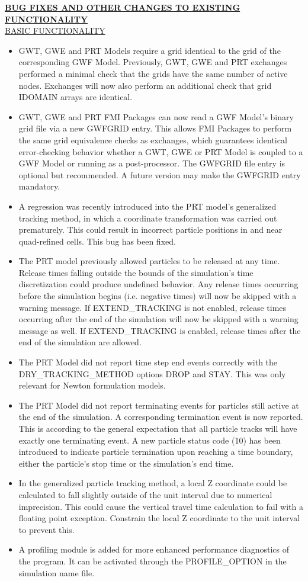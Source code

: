 \textbf{\underline{BUG FIXES AND OTHER CHANGES TO EXISTING FUNCTIONALITY}} \\
\underline{BASIC FUNCTIONALITY}
\begin{itemize}
	\item GWT, GWE and PRT Models require a grid identical to the grid of the corresponding GWF Model. Previously, GWT, GWE and PRT exchanges performed a minimal check that the grids have the same number of active nodes. Exchanges will now also perform an additional check that grid IDOMAIN arrays are identical.
	\item GWT, GWE and PRT FMI Packages can now read a GWF Model's binary grid file via a new GWFGRID entry. This allows FMI Packages to perform the same grid equivalence checks as exchanges, which guarantees identical error-checking behavior whether a GWT, GWE or PRT Model is coupled to a GWF Model or running as a post-processor. The GWFGRID file entry is optional but recommended. A future version may make the GWFGRID entry mandatory.
	\item A regression was recently introduced into the PRT model's generalized tracking method, in which a coordinate transformation was carried out prematurely. This could result in incorrect particle positions in and near quad-refined cells. This bug has been fixed.
	\item The PRT model previously allowed particles to be released at any time. Release times falling outside the bounds of the simulation's time discretization could produce undefined behavior. Any release times occurring before the simulation begins (i.e. negative times) will now be skipped with a warning message. If EXTEND\_TRACKING is not enabled, release times occurring after the end of the simulation will now be skipped with a warning message as well. If EXTEND\_TRACKING is enabled, release times after the end of the simulation are allowed.
	\item The PRT Model did not report time step end events correctly with the DRY\_TRACKING\_METHOD options DROP and STAY. This was only relevant for Newton formulation models.
	\item The PRT Model did not report terminating events for particles still active at the end of the simulation. A corresponding termination event is now reported. This is according to the general expectation that all particle tracks will have exactly one terminating event. A new particle status code (10) has been introduced to indicate particle termination upon reaching a time boundary, either the particle's stop time or the simulation's end time.
	\item In the generalized particle tracking method, a local Z coordinate could be calculated to fall slightly outside of the unit interval due to numerical imprecision. This could cause the vertical travel time calculation to fail with a floating point exception. Constrain the local Z coordinate to the unit interval to prevent this.
	\item A profiling module is added for more enhanced performance diagnostics of the program. It can be activated through the PROFILE\_OPTION in the simulation name file.
\end{itemize}

